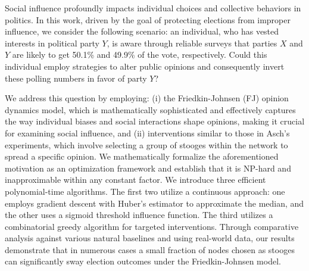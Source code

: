  Social influence profoundly impacts individual choices and collective behaviors in politics. In this work, driven by the goal of protecting elections from improper influence, we consider the following scenario: an individual, who has vested interests in political party $Y$, is aware through reliable surveys that parties $X$ and $Y$ are likely to get 50.1\% and 49.9\% of the vote, respectively. Could this individual employ   strategies to alter public opinions and consequently invert these polling numbers in favor of party $Y$?

We address this question by employing: (i) the  Friedkin-Johnsen (FJ) opinion dynamics model, which is mathematically sophisticated and effectively captures the way individual biases and social interactions shape opinions, making it crucial for examining social influence, and (ii) interventions similar to those in Asch's experiments, which involve selecting a group of stooges within the network to spread a specific opinion. We mathematically formalize the aforementioned motivation as an optimization framework and establish that it is NP-hard and inapproximable within any constant factor. We introduce three efficient polynomial-time algorithms. The first two utilize a continuous approach: one employs gradient descent with Huber's estimator to approximate the median, and the other uses a sigmoid threshold influence function. The third utilizes a combinatorial greedy algorithm for targeted interventions. Through comparative analysis against various natural baselines and using real-world data, our results demonstrate that in numerous cases a small fraction of nodes chosen as stooges can significantly sway election outcomes under the Friedkin-Johnsen model.





